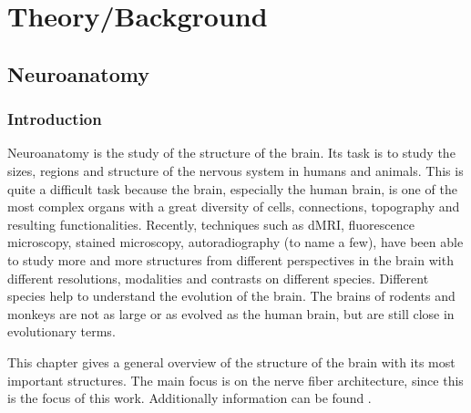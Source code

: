 \newpage\null\thispagestyle{empty}\newpage
\clearpage{\thispagestyle{empty}\cleardoublepage}
\part{Theory/Background}
\parttoc
% 
% 
% 
\cleardoublepage
\setcounter{chapter}{1}
\chapter{Neuroanatomy}
\label{chap:neuro}
%
%
%
\section{Introduction}
%
Neuroanatomy is the study of the structure of the brain.
Its task is to study the sizes, regions and structure of the nervous system in humans and animals.
This is quite a difficult task because the brain, especially the human brain, is one of the most complex organs with a great diversity of cells, connections, topography and resulting functionalities.
Recently, techniques such as \ac{dMRI}, fluorescence microscopy, stained microscopy, autoradiography (to name a few), have been able to study more and more structures from different perspectives in the brain with different resolutions, modalities and contrasts on different species.
Different species help to understand the evolution of the brain. The brains of rodents and monkeys are not as large or as evolved as the human brain, but are still close in evolutionary terms.
\par
%
This chapter gives a general overview of the structure of the brain with its most important structures.
The main focus is on the nerve fiber architecture, since this is the focus of this work.
Additionally information can be found \eg{} \dummy{}.
%
%
%
